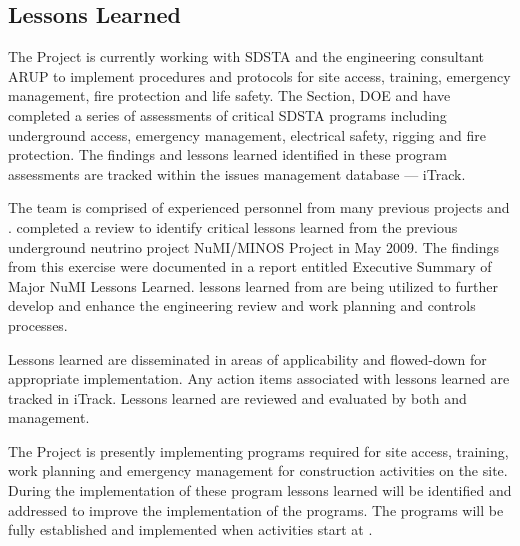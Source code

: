 \subsection{Lessons Learned}

The  Project is currently working with SDSTA and the 
engineering consultant ARUP to implement  procedures and
protocols for site access, training, emergency management, fire
protection and life safety. The \fnal {} Section, DOE and
  have completed a series of assessments of
critical SDSTA  programs including underground access,
emergency management, electrical safety, rigging and fire
protection. The findings and lessons learned identified in these
 program assessments are tracked within the \fnal issues management
database --- iTrack.

The  team is comprised of experienced personnel from many
previous projects and .  \fnal completed a review to
identify critical lessons learned from the previous underground
neutrino project NuMI/MINOS Project in May 2009. The findings from this
exercise were documented in a report entitled Executive Summary of
Major NuMI Lessons Learned.   lessons learned from
 are being utilized to further develop and enhance
the  engineering review and work planning and controls
processes.

Lessons learned are disseminated in areas of applicability and
flowed-down for appropriate implementation. Any action items
associated with lessons learned are tracked in iTrack. Lessons learned
are reviewed and evaluated by both \fnal and  management.

The  Project is presently implementing 
programs required for site access, training, work planning and
emergency management for construction activities on the 
site. During the implementation of these program lessons learned will
be identified and addressed to improve the implementation of the 
 programs.  The  programs will be fully
established and implemented when  activities start at
.
